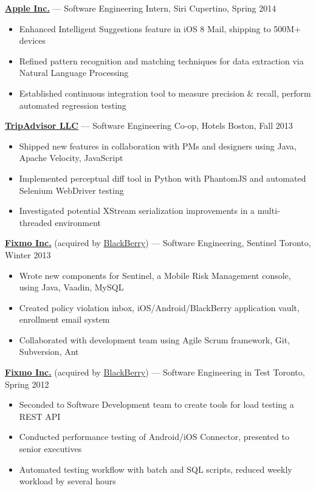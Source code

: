 \documentclass[pdftex,11pt,letterpaper]{article}
\begin{document}
\href{https://apple.com}{\textbf{Apple Inc.}} --- Software Engineering Intern, Siri \hfill {\color{gray} Cupertino, Spring 2014}
\begin{itemize}
  \item Enhanced Intelligent Suggestions feature in iOS 8 Mail, shipping to 500M+ devices
  \item Refined pattern recognition and matching techniques for data extraction via Natural Language Processing
  \item Established continuous integration tool to measure precision \& recall, perform automated regression testing
\end{itemize}

\href{http://tripadvisor.com}{\textbf{TripAdvisor LLC}} --- Software Engineering Co-op, Hotels \hfill {\color{gray} Boston, Fall 2013}
\begin{itemize}
  \item Shipped new features in collaboration with PMs and designers using Java, Apache Velocity, JavaScript
  \item Implemented perceptual diff tool in Python with PhantomJS and automated Selenium WebDriver testing
  \item Investigated potential XStream serialization improvements in a multi-threaded environment
\end{itemize}

\href{https://crunchbase.com/organization/fixmo}{\textbf{Fixmo Inc.}} (acquired by \href{https://blackberry.com}{BlackBerry}) --- Software Engineering, Sentinel \hfill {\color{gray} Toronto, Winter 2013}
\begin{itemize}
  \item Wrote new components for Sentinel, a Mobile Risk Management console, using Java, Vaadin, MySQL
  \item Created policy violation inbox, iOS/Android/BlackBerry application vault, enrollment email system
  \item Collaborated with development team using Agile Scrum framework, Git, Subversion, Ant
\end{itemize}

\href{https://crunchbase.com/organization/fixmo}{\textbf{Fixmo Inc.}} (acquired by \href{https://blackberry.com}{BlackBerry}) --- Software Engineering in Test \hfill {\color{gray} Toronto, Spring 2012}
\begin{itemize}
  \item Seconded to Software Development team to create tools for load testing a REST API
  \item Conducted performance testing of Android/iOS Connector, presented to senior executives
  \item Automated testing workflow with batch and SQL scripts, reduced weekly workload by several hours
\end{itemize}
\end{document}
